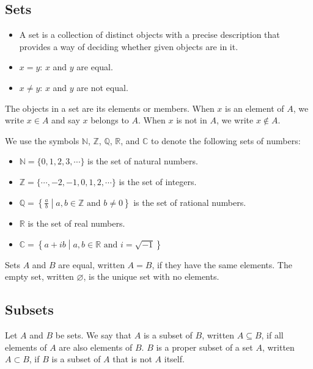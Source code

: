 \documentclass[../main.tex]{subfiles}
\begin{document}
\subsection{Sets}
\begin{itemize}
    \item A \textsf{set} is a collection of distinct objects with a precise description that provides a way of deciding whether given objects are in it.
    \item $x = y$: $x$ and $y$ are equal.
    \item $x \neq y$: $x$ and $y$ are not equal.
\end{itemize}

\begin{defn} \label{def:set}
    The objects in a set are its \textsf{elements} or \textsf{members}.
    When $x$ is an element of $A$, we write $x \in A$ and say $x$ belongs to $A$.
    When $x$ is not in $A$, we write $x \notin A$.
\end{defn}

We use the symbols $\mathbb N$, $\mathbb Z$, $\mathbb Q$, $\mathbb R$, and $\mathbb C$ to denote the following sets of numbers:
\begin{itemize}
    \item $\mathbb{N} = \{ 0, 1, 2, 3, \cdots \}$ is the set of natural numbers.
    \item $\mathbb{Z} = \{ \cdots, -2, -1, 0, 1, 2, \cdots \}$ is the set of integers.
    \item $\mathbb{Q} = \left\{ \frac a b \middle | a, b \in \mathbb{Z} \text{ and } b \neq 0\right\}$ is the set of rational numbers.
    \item $\mathbb R$ is the set of real numbers.
    \item $\mathbb{C} = \left\{ a + ib \middle | a, b \in \mathbb{R} \text{ and } i = \sqrt{-1}\right\}$
\end{itemize}

\begin{defn} \label{def:eq}
    Sets $A$ and $B$ are \textsf{equal}, written $A = B$, if they have the same elements.
    The \textsf{empty set}, written $\varnothing$, is the unique set with no elements.
\end{defn}

\subsection{Subsets}
\begin{defn} \label{def:sub}
    Let $A$ and $B$ be sets.
    We say that $A$ is a \textsf{subset} of $B$, written $A \subseteq B$, if all elements of $A$ are also elements of $B$.
    $B$ is a \textsf{proper subset} of a set $A$, written $A \subset B$, if $B$ is a subset of $A$ that is not $A$ itself.
\end{defn}
\end{document}
